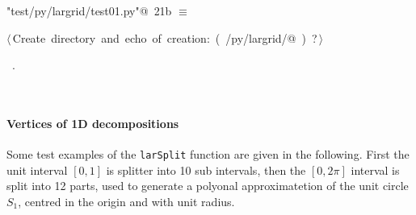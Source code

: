 \documentclass[11pt,oneside]{article}	%
\begin{document}
\begin{flushleft} \small
\begin{minipage}{\linewidth} \label{scrap33}
\protect{}\verb@"test/py/largrid/test01.py"@\nobreak\ {\footnotesize 21b }$\equiv$
\vspace{-1ex}
\begin{list}{}{} \item
\mbox{}\verb@@\hbox{$\langle\,$Create directory and echo of creation:\nobreak\ ({\footnotesize {}\label{scrap34}
 }\mbox{}\verb@test/py/largrid/@ ) {\footnotesize ?}$\,\rangle$}\verb@@\\
\mbox{}\verb@@{\NWsep}
\end{list}
\vspace{-1ex}
\footnotesize\addtolength{\baselineskip}{-1ex}
\begin{list}{}{\setlength{\itemsep}{-\parsep}\setlength{\itemindent}{-\leftmargin}}
\item \NWtxtFileDefBy\ .
\end{list}
\end{minipage}\\[4ex]
\end{flushleft}


\paragraph{Vertices of 1D decompositions}
Some test examples of the \texttt{larSplit} function are given in the following. First the unit interval $[0,1]$ is splitter into 10 sub intervals, then the $[0,2\pi]$ interval is split into 12 parts, used to generate a polyonal approximatetion of the unit circle $S_1$, centred in the origin and with unit radius.
\end{document}
